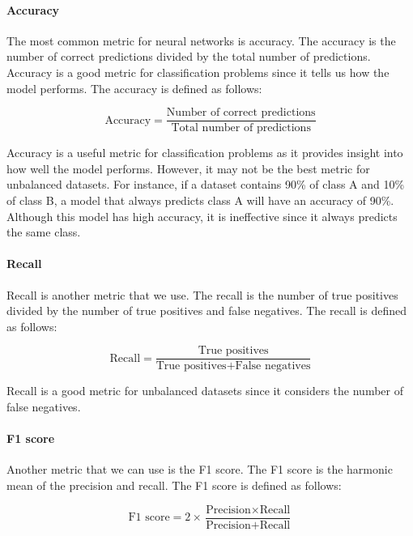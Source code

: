\paragraph{Accuracy}
The most common metric for neural networks is accuracy. The accuracy is the number of correct predictions divided by the total number of predictions. Accuracy is a good metric for classification problems since it tells us how the model performs. The accuracy is defined as follows:

\begin{equation}
    \text{Accuracy} = \frac{\text{Number of correct predictions}}{\text{Total number of predictions}}
\end{equation}

Accuracy is a useful metric for classification problems as it provides insight into how well the model performs. However, it may not be the best metric for unbalanced datasets. For instance, if a dataset contains 90\% of class A and 10\% of class B, a model that always predicts class A will have an accuracy of 90\%. Although this model has high accuracy, it is ineffective since it always predicts the same class.

\paragraph{Recall}
Recall is another metric that we use. The recall is the number of true positives divided by the number of true positives and false negatives. The recall is defined as follows:

\begin{equation}
    \text{Recall} = \frac{\text{True positives}}{\text{True positives} + \text{False negatives}}
\end{equation}

Recall is a good metric for unbalanced datasets since it considers the number of false negatives.

\paragraph{F1 score}
Another metric that we can use is the F1 score. The F1 score is the harmonic mean of the precision and recall. The F1 score is defined as follows:

\begin{equation}
    \text{F1 score} = 2 \times \frac{\text{Precision} \times \text{Recall}}{\text{Precision} + \text{Recall}}
\end{equation}

